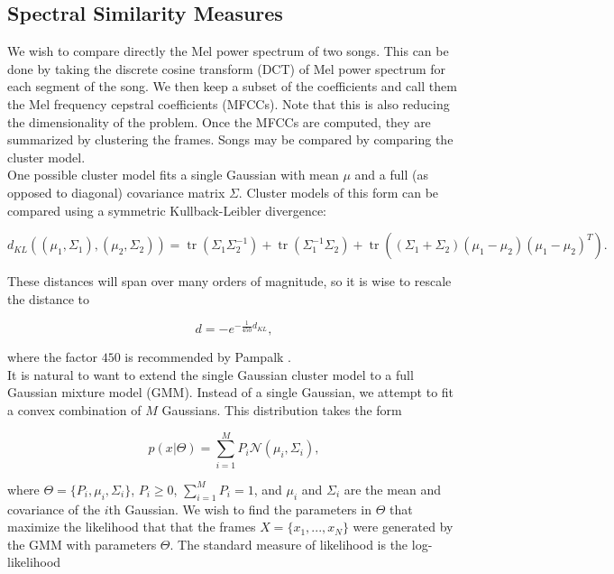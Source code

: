 \documentclass[12pt]{article}
\begin{document}
\subsection{Spectral Similarity Measures}
We wish to compare directly the Mel power spectrum of two songs.  This can be done by taking the discrete cosine transform (DCT) of Mel power spectrum for each segment of the song.  We then keep a subset of the coefficients and call them the Mel frequency cepstral coefficients (MFCCs).  Note that this is also reducing the dimensionality of the problem.  Once the MFCCs are computed, they are summarized by clustering the frames.  Songs may be compared by comparing the cluster model.\\

One possible cluster model fits a single Gaussian with mean $\mu$ and a full (as opposed to diagonal) covariance matrix $\Sigma$.  Cluster models of this form can be compared using a symmetric Kullback-Leibler divergence:

\[ d_{KL}\left(\left(\mu_1,\Sigma_1\right),\left(\mu_2,\Sigma_2\right)\right) = \operatorname{tr}\left(\Sigma_1\Sigma_2^{-1}\right) + \operatorname{tr}\left(\Sigma_1^{-1}\Sigma_2\right) + \operatorname{tr}\left(\left(\Sigma_1+\Sigma_2\right)(\mu_1-\mu_2)(\mu_1-\mu_2)^T\right). \]

\noindent These distances will span over many orders of magnitude, so it is wise to rescale the distance to

\[ d = -e^{-\frac{1}{450}d_{KL}}, \]

\noindent where the factor $450$ is recommended by Pampalk \cite{pampalk:dissertation}.\\

It is natural to want to extend the single Gaussian cluster model to a full Gaussian mixture model (GMM).  Instead of a single Gaussian, we attempt to fit a convex combination of $M$ Gaussians.  This distribution takes the form

\[ p(x|\Theta) = \sum_{i=1}^M P_i \mathcal{N}(\mu_i, \Sigma_i), \]

\noindent where $\Theta = \{P_i,\mu_i,\Sigma_i\}$, $P_i\ge 0$, $\sum_{i=1}^M P_i = 1$, and $\mu_i$ and $\Sigma_i$ are the mean and covariance of the $i$th Gaussian.  We wish to find the parameters in $\Theta$ that maximize the likelihood that that the frames $X = \{x_1,...,x_N\}$ were generated by the GMM with parameters $\Theta$.  The standard measure of likelihood is the log-likelihood
\end{document}
